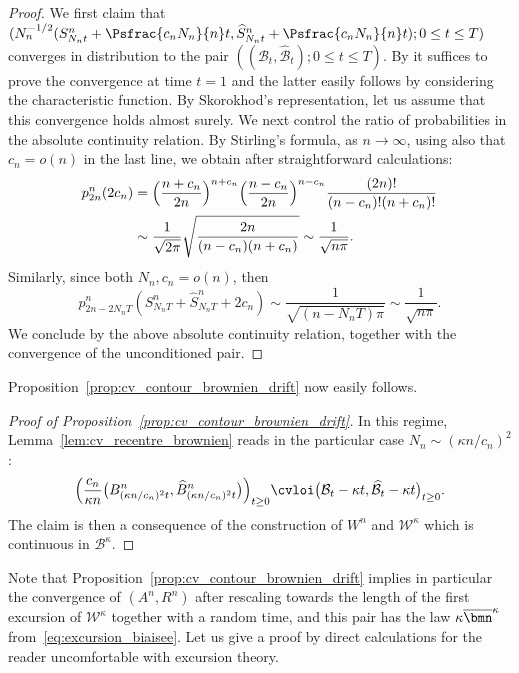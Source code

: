 \begin{proof}
We first claim that $(N_{n}^{-1/2} (S^{n}_{N_{n}t}+\Psfrac{c_{n} N_{n}}{n}t, \widehat{S}^{n}_{N_{n}t}+\Psfrac{c_{n} N_{n}}{n}t) ; 0 \le t \le T)$ converges in distribution to the pair $((\mathcal{B}_{t}, \widehat{\mathcal{B}}_{t}) ; 0 \le t \le T)$. By \eg \cite[Th.\,16.14]{Kal02} it suffices to prove the convergence at time $t=1$ and the latter easily follows by considering the characteristic function.
By Skorokhod's representation, let us assume that this convergence holds almost surely. We next control the ratio of probabilities in the absolute continuity relation.
By Stirling's formula, as $n\to\infty$, using also that $c_{n} = o(n)$ in the last line, we obtain after straightforward calculations:\vspace*{-3pt}
\begin{align*}
p^n_{2n}(2c_{n})
&= \Bigl(\frac{n+c_{n}}{2n}\Bigr)^{n+c_{n}} \Bigl(\frac{n-c_{n}}{2n}\Bigr)^{n-c_{n}} \frac{(2n)!}{(n-c_{n})! (n+c_{n})!}
\\
&\sim \frac{1}{\sqrt{2\pi}} \sqrt{\frac{2n}{(n-c_{n}) (n+c_{n})}} \sim \frac{1}{\sqrt{n\pi}}.
\end{align*}
Similarly, since both $N_{n}, c_{n} = o(n)$, then
\[
p^n_{2n-2N_{n}T}(S^{n}_{N_{n}T}+\widehat{S}^{n}_{N_{n}T}+2c_{n})
\sim \frac{1}{\sqrt{(n-N_{n}T)\pi}}
\sim \frac{1}{\sqrt{n\pi}}.
\]
We conclude by the above absolute continuity relation, together with the convergence of the unconditioned pair.
\end{proof}

Proposition~\ref{prop:cv_contour_brownien_drift} now easily follows.

\begin{proof}[Proof of Proposition~\ref{prop:cv_contour_brownien_drift}]
In this regime, Lemma~\ref{lem:cv_recentre_brownien} reads in the particular case $N_n \sim (\kappa n/c_{n})^2$:
\begin{equation}\label{eq:cv_brownien_drift}
\Bigl(\frac{c_{n}}{\kappa n} \bigl(B^{n}_{(\kappa n/c_{n})^2 t}, \widehat{B}^{n}_{(\kappa n/c_{n})^2 t}\bigr)\Bigl)_{t \ge 0}
\cvloi \bigl(\mathcal{B}_{t}-\kappa t, \widehat{\mathcal{B}}_{t}-\kappa t\bigr)_{t \ge 0}.
\end{equation}
The claim is then a consequence of the construction of $W^n$ and $\mathcal{W}^\kappa$ which is continuous in $\mathcal{B}^\kappa$.
\end{proof}

Note that Proposition~\ref{prop:cv_contour_brownien_drift} implies in particular the convergence of $(A^n, R^n)$ after rescaling towards the length of the first excursion of $\mathcal{W}^\kappa$ together with a random time, and this pair has the law $\kappa \overline{\bmn}^\kappa$ from~\eqref{eq:excursion_biaisee}. Let us give a proof by direct calculations for the reader uncomfortable with excursion theory.

